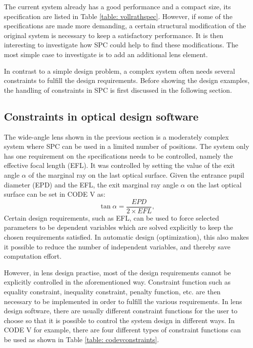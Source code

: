 The current system already has a good performance and a compact size, its specification are listed in Table \ref{table: vollrathspec}. However, if some of the specifications are made more demanding, a certain structural modification of the original system is necessary to keep a satisfactory performance. It is then interesting to investigate how SPC could help to find these modifications. The most simple case to investigate is to add an additional lens element. 

In contrast to a simple design problem, a complex system often needs several constraints to fulfill the design requirements. Before showing the design examples, the handling of constraints in SPC is first discussed in the following section.

\subsection{Constraints in optical design software} \label{Constraints in optical design software}
The wide-angle lens shown in the previous section is a moderately complex system where SPC can be used in a limited number of positions. The system only has one requirement on the specifications needs to be controlled, namely the effective focal length (EFL). It was controlled by setting the value of the exit angle $\alpha$  of the marginal ray on the last optical surface. Given the entrance pupil diameter (EPD) and the EFL, the exit marginal ray angle $\alpha$ on the last optical surface can be set in CODE V as:
\setlength{\belowdisplayshortskip}{5pt}
\setlength{\abovedisplayshortskip}{5pt}
\begin{equation} \label{eq:EFLsolve}
\tan\alpha = \frac{EPD}{2\times EFL},
\end{equation}
\noindent Certain design requirements, such as EFL, can be used to force selected parameters to be dependent variables which are solved explicitly to keep the chosen requirements satisfied. In automatic design (optimization), this also makes it possible to reduce the number of independent variables, and thereby save computation effort.

However, in lens design practise, most of the design requirements cannot be explicitly controlled in the  aforementioned way. Constraint function such as equality constraint, inequality constraint, penalty function, etc. are then necessary to be implemented in order to fulfill the various requirements. In lens design software, there are usually different constraint functions for the user to choose so that it is possible to control the system design in different ways. In CODE V for example, there are four different types of constraint functions can be used as shown in Table \ref{table: codevconstraints}.

